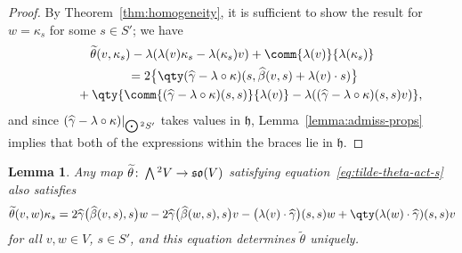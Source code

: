 \documentclass[10pt,a4paper]{amsart}
\numberwithin{equation}{section}
\newtheorem{Lemma}[Theorem]{Lemma}
\newcommand{\fh}{\mathfrak{h}}
\newcommand{\fso}{\mathfrak{so}}
\newcommand{\betahat}{\widehat{\beta}}
\newcommand{\gammahat}{\widehat{\gamma}}
\newcommand{\thetatilde}{\widetilde{\theta}}
\newcommand{\Wedge}{\mathchoice{{\textstyle\bigwedge}}{\bigwedge}{\bigwedge}{\bigwedge}}	%
\newcommand{\Odot}{\mathchoice{{\textstyle\bigodot}}{\bigodot}{\bigodot}{\bigodot}}
\newcommand{\1}{\mathbbm{1}}
\begin{document}
\begin{proof}
	By Theorem~\ref{thm:homogeneity}, it is sufficient to show the result for $w=\kappa_s$ for some $s\in S'$; we have
	\begin{gather*}
		\thetatilde(v,\kappa_s) - \lambda(\lambda(v)\kappa_s-\lambda(\kappa_s)v) + \comm{\lambda(v)}{\lambda(\kappa_s)}\\
			\qquad= 2\big\{\qty(\gammahat-\lambda\circ\kappa)(s,\betahat(v,s)+\lambda(v)\cdot s)\big\}\\
				\phantom{\qquad= }{} + \qty{\comm{(\gammahat-\lambda\circ\kappa)(s,s)}{\lambda(v)} - \lambda((\gammahat-\lambda\circ\kappa)(s,s)v)},
	\end{gather*}
	and since $(\gammahat-\lambda\circ\kappa)|_{\Odot^2S'}$ takes values in $\fh$, Lemma~\ref{lemma:admiss-props} implies that both of the expressions within the braces lie in $\fh$.
\end{proof}

\begin{Lemma}\label{lemma:tilde-theta-def-2}
	Any map $\thetatilde\colon\Wedge^2 V\to \fso(V)$ satisfying equation~\eqref{eq:tilde-theta-act-s} also satisfies
	\begin{gather*}
		\thetatilde(v,w)\kappa_s
			= 2\gammahat\bigl(\betahat(v,s),s\bigr)w
				- 2\gammahat\bigl(\betahat(w,s),s\bigr)v- \bigl(\lambda(v)\cdot\gammahat\bigr)(s,s)w
				+ \qty(\lambda(w)\cdot\gammahat)(s,s)v\label{eq:tilde-theta-def-2}
	\end{gather*}
	for all $v,w\in V$, $s\in S'$, and this equation determines $\thetatilde$ uniquely.
\end{Lemma}
\end{document}
